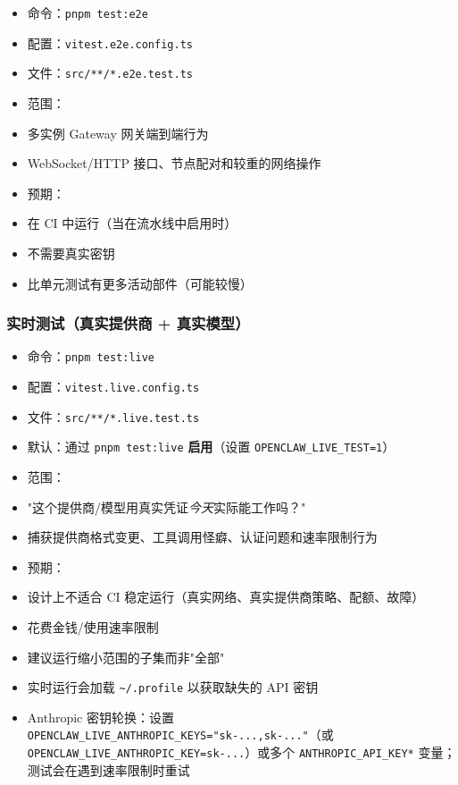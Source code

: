 \begin{itemize}
  \item 命令：\texttt{pnpm test:e2e}
  \item 配置：\texttt{vitest.e2e.config.ts}
  \item 文件：\texttt{src/**/*.e2e.test.ts}
  \item 范围：
  \item 多实例 Gateway 网关端到端行为
  \item WebSocket/HTTP 接口、节点配对和较重的网络操作
  \item 预期：
  \item 在 CI 中运行（当在流水线中启用时）
  \item 不需要真实密钥
  \item 比单元测试有更多活动部件（可能较慢）
\end{itemize}


\subsubsection{实时测试（真实提供商 + 真实模型）}


\begin{itemize}
  \item 命令：\texttt{pnpm test:live}
  \item 配置：\texttt{vitest.live.config.ts}
  \item 文件：\texttt{src/**/*.live.test.ts}
  \item 默认：通过 \texttt{pnpm test:live} \textbf{启用}（设置 \texttt{OPENCLAW\_LIVE\_TEST=1}）
  \item 范围：
  \item "这个提供商/模型用真实凭证\textit{今天}实际能工作吗？"
  \item 捕获提供商格式变更、工具调用怪癖、认证问题和速率限制行为
  \item 预期：
  \item 设计上不适合 CI 稳定运行（真实网络、真实提供商策略、配额、故障）
  \item 花费金钱/使用速率限制
  \item 建议运行缩小范围的子集而非"全部"
  \item 实时运行会加载 \texttt{\textasciitilde{}/.profile} 以获取缺失的 API 密钥
  \item Anthropic 密钥轮换：设置 \texttt{OPENCLAW\_LIVE\_ANTHROPIC\_KEYS="sk-...,sk-..."}（或 \texttt{OPENCLAW\_LIVE\_ANTHROPIC\_KEY=sk-...}）或多个 \texttt{ANTHROPIC\_API\_KEY*} 变量；测试会在遇到速率限制时重试
\end{itemize}



